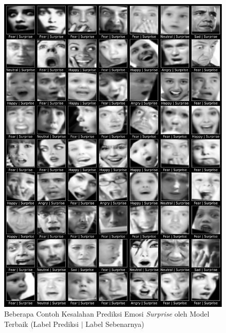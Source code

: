 \begin{figure}[t]
    \centering
    \includegraphics[width=14cm]{gambar/contoh_hasil_prediksi_false_surprise.png}
    \caption{Beberapa Contoh Kesalahan Prediksi Emosi \textit{Surprise} oleh Model Terbaik (Label Prediksi $|$ Label Sebenarnya)}
    \label{fig:hasilprediksifalse5}
\end{figure}

